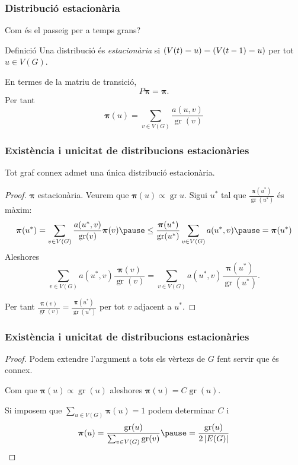 \documentclass[aspectratio=169, 12pt]{beamer}
\let\P\relax
\DeclareMathOperator{\P}{P}
\renewcommand{\vec}[1]{\mathbf{\bm #1}}
\DeclareMathOperator{\gr}{gr}
\newcommand{\abs}[1]{\left\lvert #1 \right\rvert}
\begin{document}
\begin{frame}
	\frametitle{Distribució estacionària}
	Com és el passeig per a temps grans? \pause

	\begin{block}{Definició}
		Una distribució és \emph{estacionària} si \( \P(V(t) = u) = \P(V(t - 1) = u) \) per tot \( u \in V(G) \).
	\end{block} \pause

	En termes de la matriu de transició, \[ P\vec{\pi} = \vec{\pi}. \] \pause
	Per tant
	\begin{equation*}
		\vec{\pi}(u) = \sum_{v \in V(G)}\frac{a(u,v)}{\gr(v)}
	\end{equation*}

\end{frame}

\begin{frame}
	\frametitle{Existència i unicitat de distribucions estacionàries}
	\begin{theorem}
		Tot graf connex admet una única distribució estacionària.
	\end{theorem}
	\pause

	\begin{proof}
		\( \vec{\pi} \) estacionària. Veurem que \( \vec{\pi}(u) \propto \gr{u} \). \pause Sigui \( u^\ast \) tal que \( \frac{\vec{\pi}(u^\ast)}{\gr(u^\ast)} \) és màxim: \pause 
		\begin{equation*}
			\vec{\pi}(u^\ast) = \sum_{v \in V(G)} \frac{a(u^\ast,v)}{\gr(v)} \vec{\pi}(v) \pause \leq \frac{\vec{\pi}(u^\ast)}{\gr(u^\ast)} \sum_{v \in V(G)} a(u^{\ast},v) \pause = \vec{\pi}(u^\ast)
		\end{equation*}
		Aleshores \[ \sum_{v \in V(G)} a(u^\ast,v) \frac{\vec{\pi}(v)}{\gr(v)}  = \sum_{v \in V(G)} a(u^\ast,v) \frac{\vec{\pi}(u^\ast)}{\gr(u^\ast)}. \] \pause 
		
		Per tant \( \frac{\vec{\pi}(v)}{\gr(v)} = \frac{\vec{\pi}(u^\ast)}{\gr(u^\ast)} \) per tot \( v \) adjacent a \( u^\ast \). 
	\end{proof}
\end{frame}

\begin{frame}
	\frametitle{Existència i unicitat de distribucions estacionàries}
	\begin{proof}
		Podem extendre l'argument a tots els vèrtexs de \( G \) fent servir que és connex. \pause

		Com que \( \vec{\pi}(u) \propto \gr(u) \) aleshores \( \vec{\pi}(u) = C\gr(u) \). \pause
		
		Si imposem que \( \sum_{u \in V(G)} \vec{\pi}(u) = 1 \) podem determinar \( C \) i 
		\begin{equation*}
			\vec{\pi}(u) =  \frac{\gr(u)}{\sum_{v \in V(G)} \gr(v)} \pause = \frac{\gr(u)}{2 \abs{E(G)}}
		\end{equation*}

	\end{proof}
\end{frame}
\end{document}
